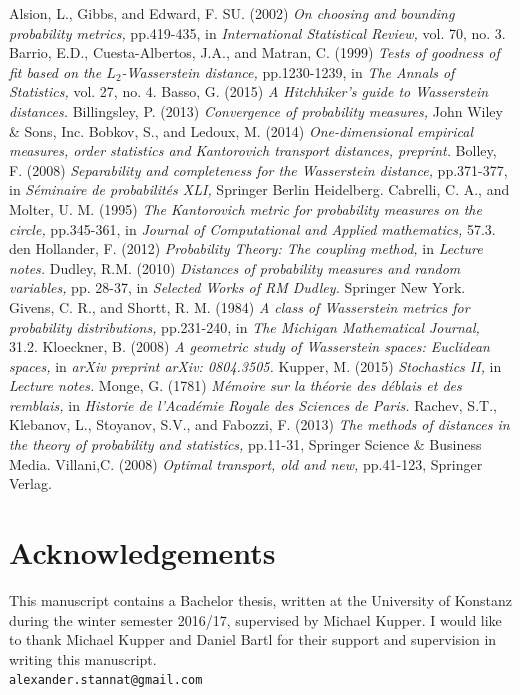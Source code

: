 \documentclass[11pt,a4paper]{article}
\begin{document}
\begin{thebibliography}{9}
Alsion, L., Gibbs, and Edward, F. SU. (2002)
\emph{On choosing and bounding probability metrics,} pp.419-435, in
\emph{International Statistical Review,} vol. 70, no. 3. 
Barrio, E.D., Cuesta-Albertos, J.A., and Matran, C. (1999)
\emph{Tests of goodness of fit based on the $L_2$-Wasserstein distance,} pp.1230-1239, in \emph{The Annals of Statistics,} vol. 27, no. 4. 
Basso, G. (2015)
\emph{A Hitchhiker's guide to Wasserstein distances.}
Billingsley, P. (2013)
\emph{Convergence of probability measures,} John Wiley \& Sons, Inc.
Bobkov, S., and Ledoux, M. (2014)
\emph{One-dimensional empirical measures, order statistics and Kantorovich transport distances, preprint.}
Bolley, F. (2008)
\emph{Separability and completeness for the Wasserstein distance,} pp.371-377, in
\emph{Séminaire de probabilités XLI,} Springer Berlin Heidelberg.
Cabrelli, C. A., and Molter, U. M. (1995)
\emph{The Kantorovich metric for probability measures on the circle,} pp.345-361, in
\emph{Journal of Computational and Applied mathematics,} 57.3.
den Hollander, F. (2012)
\emph{Probability Theory: The coupling method,} in
\emph{Lecture notes.}
Dudley, R.M. (2010)
\emph{Distances of probability measures and random variables,} pp. 28-37, in
\emph{Selected Works of RM Dudley.} Springer New York.
Givens, C. R., and Shortt, R. M. (1984)
\emph{A class of Wasserstein metrics for probability distributions,} pp.231-240, in
\emph{The Michigan Mathematical Journal,} 31.2.
Kloeckner, B. (2008)
\emph{A geometric study of Wasserstein spaces: Euclidean spaces,} in  \emph{arXiv preprint arXiv: 0804.3505.}
Kupper, M. (2015)
\emph{Stochastics II,} in
\emph{Lecture notes.}
Monge, G. (1781)
\emph{Mémoire sur la théorie des déblais et des remblais,} in \emph{Historie de l'Académie Royale des Sciences de Paris.}
Rachev, S.T., Klebanov, L., Stoyanov, S.V., and Fabozzi, F. (2013)
\emph{The methods of distances in the theory of probability and statistics,} pp.11-31, Springer Science \& Business Media.
Villani,C. (2008)
\emph{Optimal transport, old and new,} pp.41-123, Springer Verlag.
\vspace{1em}\\
\end{thebibliography}

\section*{Acknowledgements}
This manuscript contains a Bachelor thesis, written at the University of Konstanz during the winter semester 2016/17, supervised by Michael Kupper. I would like to thank Michael Kupper and Daniel Bartl for their support and supervision in writing this manuscript.\\
{\tt alexander.stannat@gmail.com}
\newpage
\end{document}
